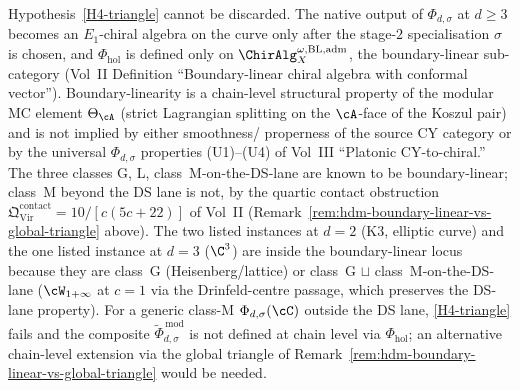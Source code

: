 \begin{remark}
\label{rem:hdm-triangle-bl-required}
Hypothesis~\textup{\ref{H4-triangle}} cannot be discarded. The
native output of $\Phi_{d,\sigma}$ at $d \geq 3$ becomes an $E_1$-chiral
algebra on the curve only after the stage-$2$ specialisation
$\sigma$ is chosen, and
$\Phi_{\mathrm{hol}}$ is defined only on
$\ChirAlg^{\omega,\mathrm{BL,adm}}_X$, the boundary-linear sub-category
\textup{(}Vol~II Definition ``Boundary-linear chiral algebra with
conformal vector''\textup{).} Boundary-linearity is a chain-level
structural property of the modular MC element $\Theta_\cA$
\textup{(}strict Lagrangian splitting on the $\cA$-face of the
Koszul pair\textup{)} and is not implied by either smoothness/
properness of the source CY category or by the universal $\Phi_{d,\sigma}$
properties \textup{(U1)--(U4)} of Vol~III ``Platonic
CY-to-chiral.'' The three classes G, L, class~M-on-the-DS-lane are
known to be boundary-linear; class~M beyond the DS lane is not, by
the quartic contact obstruction
$\mathfrak{Q}^{\mathrm{contact}}_{\mathrm{Vir}} = 10/[c(5c+22)]$
of Vol~II
\textup{(}Remark~\textup{\ref{rem:hdm-boundary-linear-vs-global-triangle}}
above\textup{).} The two listed instances at $d=2$
\textup{(}K3, elliptic curve\textup{)} and the one listed instance
at $d=3$ \textup{(}$\C^3$\textup{)} are inside the boundary-linear
locus because they are class~G \textup{(}Heisenberg/lattice\textup{)}
or class~G $\sqcup$ class~M-on-the-DS-lane
\textup{(}$\cW_{1+\infty}$ at $c=1$ via the Drinfeld-centre passage,
which preserves the DS-lane property\textup{).} For a generic
class-M $\Phi_{d,\sigma}(\cC)$ outside the DS lane,
\textup{\ref{H4-triangle}} fails and the composite
$\widetilde\Phi_{d,\sigma}^{\,\mathrm{mod}}$ is not defined at chain level
via $\Phi_{\mathrm{hol}}$; an alternative chain-level extension via
the global triangle of
Remark~\textup{\ref{rem:hdm-boundary-linear-vs-global-triangle}}
would be needed.
\end{remark}

